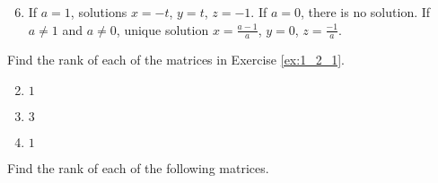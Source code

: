 \begin{multicols}{2}
\begin{ex}
\begin{sol}
\begin{enumerate}[label={\alph*.}]
\setcounter{enumi}{5}
\item  If $a = 1$, solutions $x = -t$, $y = t$, $z = -1$. If $a = 0$, there is no solution. If $a \neq 1$ and $a \neq 0$, unique solution $x = \frac{a - 1}{a} $, $ y = 0$, $z = \frac{-1}{a}$.

\end{enumerate}
\end{sol}
\end{ex}

\begin{ex}
Find the rank of each of the matrices in Exercise \ref{ex:1_2_1}.

\begin{sol}
\begin{enumerate}[label={\alph*.}]
\setcounter{enumi}{1}
\item  $1$
\setcounter{enumi}{3}
\item  $3$
\setcounter{enumi}{5}
\item  $1$
\end{enumerate}
\end{sol}
\end{ex}

\begin{ex}
Find the rank of each of the following matrices.


\end{ex}
\end{multicols}
